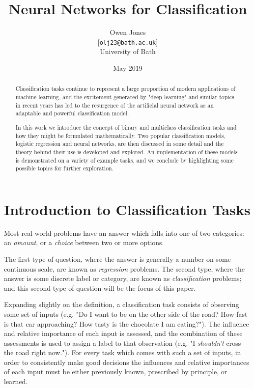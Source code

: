 \documentclass{article}[11pt]
\title{Neural Networks for Classification}
\author{
    Owen Jones \\
    {[\texttt{olj23@bath.ac.uk}]} \\
    University of Bath
}
\date{May 2019}
\begin{document}
	
\maketitle


\begin{abstract}
    
    Classification tasks continue to represent a large proportion of modern applications of machine learning, and the excitement generated by "deep learning" and similar topics in recent years has led to the resurgence of the artificial neural network as an adaptable and powerful classification model.
    
    In this work we introduce the concept of binary and multiclass classification tasks and how they might be formulated mathematically. Two popular classification models, logistic regression and neural networks, are then discussed in some detail and the theory behind their use is developed and explored. An implementation of these models is demonstrated on a variety of example tasks, and we conclude by highlighting some possible topics for further exploration.
    
\end{abstract}



\section{Introduction to Classification Tasks}
    
    Most real-world problems have an answer which falls into one of two categories: an \textit{amount}, or a \textit{choice} between two or more options.
    
    The first type of question, where the answer is generally a number on some continuous scale, are known as \textit{regression} problems. The second type, where the answer is some discrete label or category, are known as \textit{classification} problems; and this second type of question will be the focus of this paper.
    
    Expanding slightly on the definition, a classification task consists of observing some set of inputs (e.g. "Do I want to be on the other side of the road? How fast is that car approaching? How tasty is the chocolate I am eating?"). The influence and relative importance of each input is assessed, and the combination of these assessments is used to assign a label to that observation (e.g. "I \textit{shouldn't} cross the road right now."). For every task which comes with such a set of inputs, in order to consistently make good decisions the influences and relative importances of each input must be either previously known, prescribed by principle, or learned.
    
\end{document}
